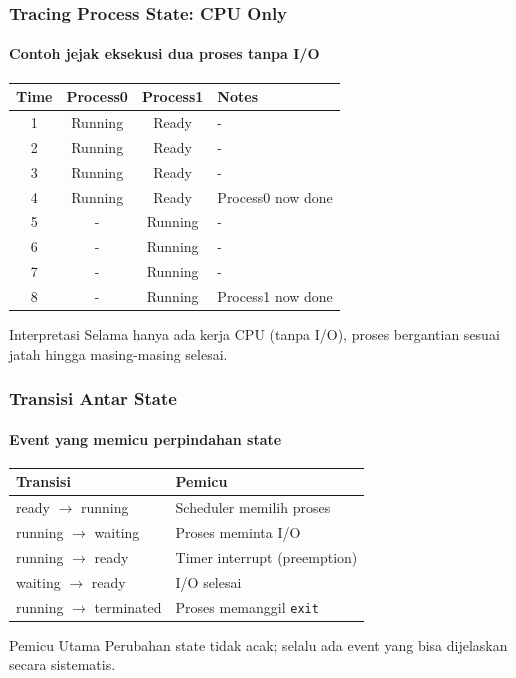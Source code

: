 \documentclass[t,aspectratio=169,xcolor=dvipsnames]{beamer}
\begin{document}
\begin{frame}
    \frametitle{Tracing Process State: CPU Only}
    \framesubtitle{Contoh jejak eksekusi dua proses tanpa I/O}
    \scriptsize
    \begin{center}
        \begin{tabular}{|c|c|c|p{4.2cm}|}
            \hline
            \textbf{Time} & \textbf{Process0} & \textbf{Process1} & \textbf{Notes} \\
            \hline
            1 & Running & Ready & - \\
            \hline
            2 & Running & Ready & - \\
            \hline
            3 & Running & Ready & - \\
            \hline
            4 & Running & Ready & Process0 now done \\
            \hline
            5 & - & Running & - \\
            \hline
            6 & - & Running & - \\
            \hline
            7 & - & Running & - \\
            \hline
            8 & - & Running & Process1 now done \\
            \hline
        \end{tabular}
    \end{center}
    \begin{alertblock}{Interpretasi}
        Selama hanya ada kerja CPU (tanpa I/O), proses bergantian sesuai jatah hingga masing-masing selesai.
    \end{alertblock}
\end{frame}

\begin{frame}
    \frametitle{Transisi Antar State}
    \framesubtitle{Event yang memicu perpindahan state}
    \small
    \begin{tabular}{|p{}|p{}|}
        \hline
        \textbf{Transisi} & \textbf{Pemicu} \\
        \hline
        ready $\rightarrow$ running & Scheduler memilih proses \\
        \hline
        running $\rightarrow$ waiting & Proses meminta I/O \\
        \hline
        running $\rightarrow$ ready & Timer interrupt (preemption) \\
        \hline
        waiting $\rightarrow$ ready & I/O selesai \\
        \hline
        running $\rightarrow$ terminated & Proses memanggil \texttt{exit} \\
        \hline
    \end{tabular}
    \begin{exampleblock}{Pemicu Utama}
        Perubahan state tidak acak; selalu ada event yang bisa dijelaskan secara sistematis.
    \end{exampleblock}
\end{frame}
\end{document}
